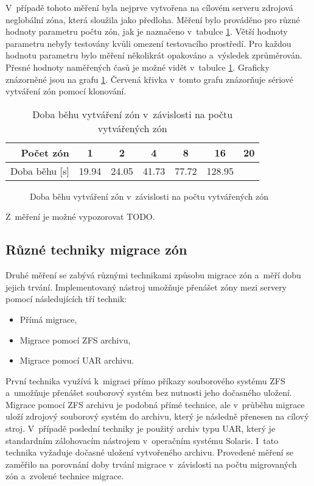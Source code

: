 V~případě tohoto měření byla nejprve vytvořena na cílovém serveru zdrojová neglobální zóna, která sloužila jako předloha.
Měření bylo prováděno pro různé hodnoty parametru počtu zón, jak je naznačeno v~tabulce \ref{table:measuremet:creation}. Větší
hodnoty parametru nebyly testovány kvůli omezení testovacího prostředí. Pro každou hodnotu parametru bylo měření několikrát
opakováno a~výsledek zprůměrován. Přesné hodnoty naměřených časů je možné vidět v~tabulce \ref{table:measuremet:creation}. Graficky
znázorněné jsou na grafu \ref{graph:measuremet:creation}. Červená křivka v~tomto grafu znázorňuje sériové vytváření zón pomocí klonování.

\begin{table}
  \centering
  \label{table:measuremet:creation}
  \caption{Doba běhu vytváření zón v~závislosti na počtu vytvářených zón}
  \begin{tabular}{ r | c c c c c c}
   Počet zón & 1 & 2 & 4 & 8 & 16 & 20  \\ \hline
   Doba běhu [s] & 19.94 & 24.05 & 41.73 & 77.72 & 128.95 & \\
  \end{tabular}
\end{table}

\begin{figure}
  \centering
  \label{graph:measuremet:creation}
  \caption{Doba běhu vytváření zón v~závislosti na počtu vytvářených zón}
\end{figure}

Z~měření je možné vypozorovat TODO.
\subsection{Různé techniky migrace zón}
\label{chapter:measurement:migration}
Druhé měření se zabývá různými technikami způsobu migrace zón a~měří dobu jejich trvání. Implementovaný nástroj umožňuje přenášet zóny mezi
servery pomocí následujících tří technik:
\begin{itemize}
 \item Přímá migrace,
 \item Migrace pomocí ZFS archivu,
 \item Migrace pomocí UAR archivu.
\end{itemize}
První technika využívá k~migraci přímo příkazy souborového systému ZFS a~umožňuje přenášet souborový systém bez nutnosti jeho dočasného
uložení. Migrace pomocí ZFS archivu je podobná přímé technice, ale v~průběhu migrace uloží zdrojový souborový systém do archivu,
který je následně přenesen na cílový stroj. V~případě poslední techniky je použitý archiv typu UAR, který je standardním zálohovacím
nástrojem v~operačním systému Solaris. I~tato technika vyžaduje dočasné uložení vytvořeného archivu. Provedené měření se zaměřilo
na porovnání doby trvání migrace v~závislosti na počtu migrovaných zón a~zvolené technice migrace.

